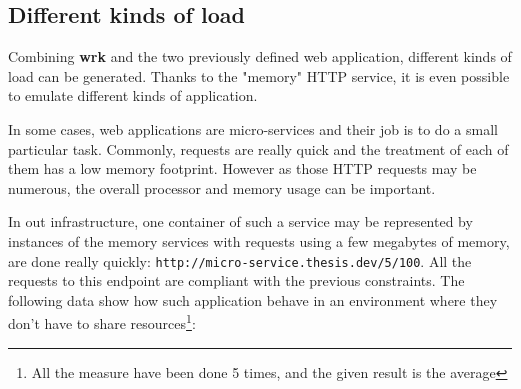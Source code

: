 \subsection{Different kinds of load}

Combining \textbf{wrk} and the two previously defined web application, different
kinds of load can be generated. Thanks to the "memory" HTTP service, it is even
possible to emulate different kinds of application.

In some cases, web applications are micro-services and their job is to do a small
particular task. Commonly, requests are really quick and the treatment of each of
them has a low memory footprint. However as those HTTP requests may be numerous,
the overall processor and memory usage can be important.

In out infrastructure, one container of such a service may be represented by instances
of the memory services with requests using a few megabytes of memory, are done
really quickly: \texttt{http://micro-service.thesis.dev/5/100}. All the requests to this
endpoint are compliant with the previous constraints. The following data show how 
such application behave in an environment where they don't have to share resources\footnote{All the measure
have been done 5 times, and the given result is  the average}:

